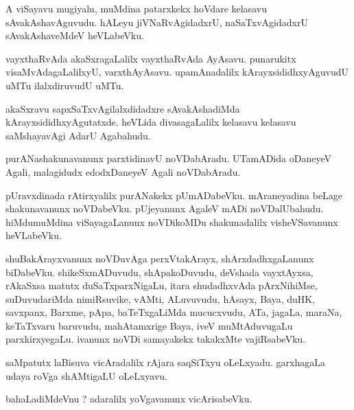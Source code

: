\documentclass{article}
\begin{document}
\begin{mn}
A  viSayavu  mugiyalu,  muMdina  patarxkekx  hoVdare  kelasavu  sAvakAshavAguvudu.  hALeyu  jiVNaRvAgidadxrU,  naSaTxvAgidadxrU  
sAvakAshaveMdeV  heVLabeVku.
\end{mn}

\begin{mn}
vayxthaRvAda  akaSxragaLalilx  vayxthaRvAda  AyAsavu.  punarukitx  visaMvAdagaLalilxyU,  varxthAyAsavu.  upamAnadalilx  kArayxsididhxyAguvudU  
uMTu  ilalxdiruvudU  uMTu.
\end{mn}

\begin{mn}
akaSxravu  sapxSaTxvAgilalxdidadxre  sAvakAshadiMda  kArayxsididhxyAgutatxde.  heVLida  divasagaLalilx  kelasavu  kelasavu  saMshayavAgi  AdarU  Agabahudu.
\end{mn}

\begin{mn}
purANashakunavanunx  parxtidinavU  noVDabAradu.  UTamADida  oDaneyeV  Agali,  malagidudx  edodxDaneyeV  Agali noVDabAradu.
\end{mn}

\begin{mn}
pUravxdinada  rAtirxyalilx  purANakekx  pUmADabeVku.  mAraneyadina  beLage  shakunavanunx  noVDabeVku.  pUjeyanunx  AgaleV  mADi  noVDalUbahudu.  
hiMdumuMdina  viSayagaLanunx  noVDikoMDu  shakunadalilx  visheVSavanunx  heVLabeVku.
\end{mn}

\begin{mn}
shuBakArayxvanunx  noVDuvAga  perxVtakArayx,  shArxdadhxgaLanunx  biDabeVku.  shikeSxmADuvudu,  shApakoDuvudu,  deVshada  vayxtAyxsa,  
rAkaSxsa  matutx  duSaTxparxNigaLu,  itara  shudadhxvAda   pArxNihiMse,  suDuvudariMda  nimiRsuvike,  vAMti,  ALuvuvudu,  hAsayx,  Baya,  
duHK,  savxpanx,  Barxme,  pApa,  baTeTxgaLiMda  mucucxvudu,  ATa,  jagaLa,  maraNa,  keTaTxvaru  baruvudu,  mahAtamxrige  Baya,  iveV  
muMtAduvugaLu  parxkirxyegaLu.  ivanunx  noVDi  samayakekx  takakxMte  vajiRsabeVku.
\end{mn}

\begin{mn}
saMpatutx  laBisuva  vicAradalilx  rAjara  saqSiTxyu  oLeLxyadu.  garxhagaLa   udaya  roVga  shAMtigaLU  oLeLxyavu.
\end{mn}

\begin{mn}
bahaLadiMdeVnu ?  adaralilx  yoVgavanunx  vicArisabeVku.
\end{mn}
\end{document}
